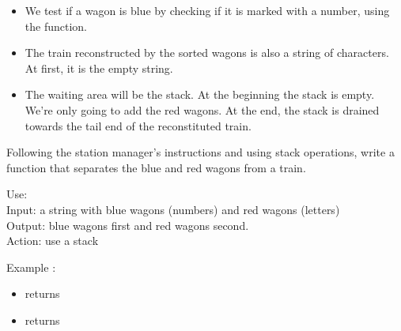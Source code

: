 \documentclass[11pt,class=report,crop=false]{standalone}
\begin{document}
\begin{activite}
\begin{itemize}
  \item We test if a wagon is blue by checking if it is marked with a number, using the  function.
  
  \item The train reconstructed by the sorted wagons is also a string of characters. At first, it is the empty string.
  
  \item The waiting area will be the stack. At the beginning the stack is empty. We're only going to add the red wagons. At the end, the stack is drained towards the tail end of the reconstituted train.
\end{itemize}


Following the station manager's instructions and using stack operations, write a  function that separates the blue and red wagons from a train.


\begin{fonction}
  Use:  \\
  Input: a string with blue wagons (numbers) and red wagons (letters) \\
  Output: blue wagons first and red wagons second.\\
  Action: use a stack
  
  \medskip
    
  Example : 
  \begin{itemize}
    \item {} returns 
    \item {} returns 
    \end{itemize}
    
\end{fonction}

\end{activite}

\end{document}
